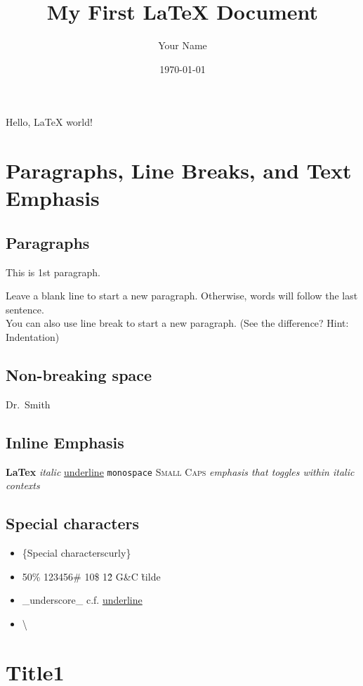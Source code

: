 \documentclass[12pt]{article}
\title{My First LaTeX Document}
\author{Your Name}
\date{\today}
\begin{document}
\maketitle
\tableofcontents

Hello, LaTeX world!

\section{Paragraphs, Line Breaks, and Text Emphasis}
\subsection{Paragraphs}
This is 1st paragraph.

Leave a blank line to start a new paragraph.
Otherwise, words will follow the last sentence. \\
You can also use line break to start a new paragraph. (See the difference? Hint: Indentation)

\subsection{Non-breaking space}
Dr.~Smith

\subsection{Inline Emphasis}
\textbf{LaTex}
\textit{italic} 
\underline{underline} 
\texttt{monospace} %
\textsc{Small Caps}
\emph{emphasis that toggles within italic contexts}

\subsection{Special characters}

\begin{itemize}
    \item \{Special characterscurly\} %
    \item 50\% 123456\# 10\$  1\^2 G\&C \~{tilde} %
    \item \_underscore\_ c.f. \underline{underline}
    \item \textbackslash{} %
\end{itemize}

\section{Title1}
\end{document}
